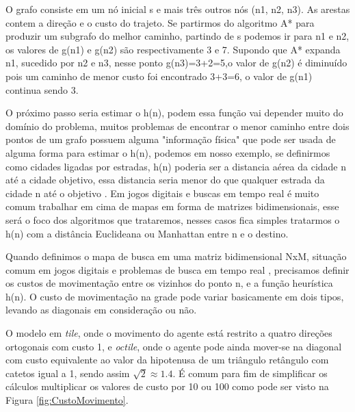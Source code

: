 O grafo consiste em um nó inicial s e mais três outros nós (n1, n2, n3). As arestas contem a direção e o custo do trajeto. Se partirmos do algoritmo A* para produzir um subgrafo do melhor caminho, partindo de s podemos ir para n1 e n2, os valores de g(n1) e g(n2) são respectivamente 3 e 7. Supondo que A* expanda n1, sucedido por n2 e n3, nesse ponto g(n3)=3+2=5,o valor de g(n2) é diminuído pois um caminho de menor custo foi encontrado  3+3=6, o valor de g(n1) continua sendo 3.

O próximo passo seria estimar o h(n), podem essa função vai depender muito do domínio do problema, muitos problemas de encontrar o menor caminho entre dois pontos de um grafo possuem alguma "informação física" que pode ser usada de alguma forma para estimar o h(n), podemos em nosso exemplo, se definirmos como cidades ligadas por estradas, h(n) poderia ser a distancia aérea da cidade n até a cidade objetivo, essa distancia seria menor do que qualquer estrada da cidade n até o objetivo \cite{PEHart}. Em jogos digitais e buscas em tempo real é muito comum trabalhar em cima de mapas em forma de matrizes bidimensionais, esse será o foco dos algoritmos que trataremos, nesses casos fica simples tratarmos o h(n) com a distância Euclideana ou Manhattan entre n e o destino. \cite{Yngvi}

Quando definimos o mapa de busca em uma matriz bidimensional NxM, situação comum em jogos digitais e problemas de busca em tempo real \cite{Ross_Graham} \cite{Ulysses} \cite{Ulysses2}, precisamos definir os custos de movimentação entre os vizinhos do ponto n, e a função heurística h(n). O custo de movimentação na grade pode variar basicamente em dois tipos, levando as diagonais em consideração ou não.

O modelo em \textit{tile}, onde o movimento do agente está restrito a quatro direções ortogonais com custo 1, e \textit{octile}, onde o agente pode ainda mover-se na diagonal com custo equivalente ao valor da hipotenusa de um triângulo retângulo com catetos igual a 1, sendo assim  $ \sqrt{2}  \approx 1.4 $. É comum para fim de simplificar os cálculos multiplicar os valores de custo por 10 ou 100 como pode ser visto na Figura \ref{fig:CustoMovimento}.

\begin{minipage}{\linewidth}
    \label{fig:CustoMovimento}
\end{minipage}

